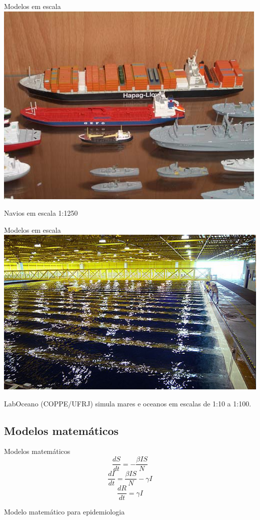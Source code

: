 \documentclass{beamer}
\begin{document}
\begin{frame}{Modelos em escala}
  \centering
  \includegraphics[width=.8\textwidth]{modelos/Zinnschiffe}

Navios em escala 1:1250
\end{frame}

\begin{frame}{Modelos em escala}
  \centering
  \includegraphics[width=\textwidth]{modelos/laboceano}

LabOceano (COPPE/UFRJ) simula mares e oceanos em escalas de 1:10 a 1:100.
\end{frame}

\subsection{Modelos matemáticos}

\begin{frame}{Modelos matemáticos}
  \centering
  \begin{displaymath}
    \frac{dS}{dt} = -\frac{\beta I S}{N}
  \end{displaymath}
  \begin{displaymath}
    \frac{dI}{dt} = \frac{\beta I S}{N} - \gamma I
  \end{displaymath}
  \begin{displaymath}
    \frac{dR}{dt} = \gamma I
  \end{displaymath}

\bigskip
Modelo matemático para epidemiologia
\end{frame}
\end{document}
